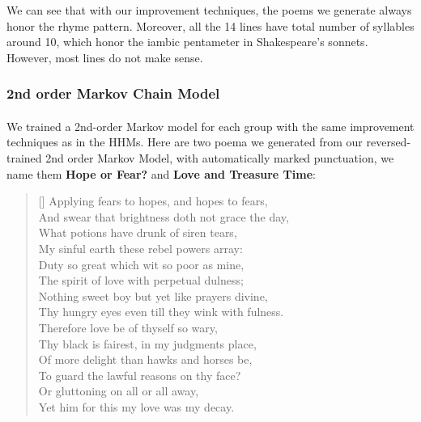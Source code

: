 We can see that with our improvement techniques, the poems we generate always honor the rhyme pattern. Moreover, all the 14 lines have total number of syllables around 10, which honor the iambic pentameter in Shakespeare's sonnets. However, most lines do not make sense.

\subsubsection{2nd order Markov Chain Model}
\paragraph{}
We trained a 2nd-order Markov model for each group with the same improvement techniques as in the HHMs. Here are two poema we generated from our reversed-trained 2nd order Markov Model, with automatically marked punctuation, we name them \textbf{Hope or Fear?} and \textbf{Love and Treasure Time}:
\renewcommand{\poemtoc}{subsection}
\settowidth{\versewidth}{Thy proud hearts slave and vassal wretch to be?}
\begin{verse}[\versewidth]
Applying fears to hopes, and hopes to fears,\\
And swear that brightness doth not grace the day,\\
What potions have drunk of siren tears,\\
My sinful earth these rebel powers array:\\
\vspace{5pt}
Duty so great which wit so poor as mine,\\
The spirit of love with perpetual dulness;\\
Nothing sweet boy but yet like prayers divine,\\
Thy hungry eyes even till they wink with fulness.\\
\vspace{5pt}
Therefore love be of thyself so wary,\\
Thy black is fairest, in my judgments place,\\
Of more delight than hawks and horses be,\\
To guard the lawful reasons on thy face?\\
\vspace{5pt}
\vin  Or gluttoning on all or all away,\\
\vin  Yet him for this my love was my decay.\\
\end{verse}


